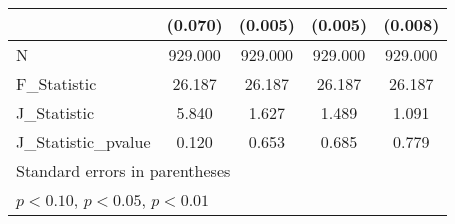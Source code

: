 {\begin{tabular}{l*{4}{c}}
            &     (0.070)         &     (0.005)         &     (0.005)         &     (0.008)         \\
\hline
N           &     929.000         &     929.000         &     929.000         &     929.000         \\
F\_Statistic &      26.187         &      26.187         &      26.187         &      26.187         \\
J\_Statistic &       5.840         &       1.627         &       1.489         &       1.091         \\
J\_Statistic\_pvalue&       0.120         &       0.653         &       0.685         &       0.779         \\
\hline\hline
\multicolumn{5}{l}{\footnotesize Standard errors in parentheses}\\
\multicolumn{5}{l}{\footnotesize \sym{*} \(p<0.10\), \sym{**} \(p<0.05\), \sym{***} \(p<0.01\)}\\
\end{tabular}
}
